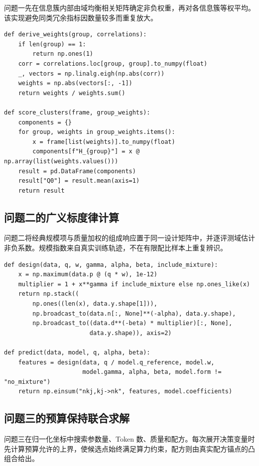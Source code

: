 \documentclass[bwprint]{gmcmthesis}
\begin{document}
\begin{appendices}
    问题一先在信息簇内部由域均衡相关矩阵确定非负权重，再对各信息簇等权平均。该实现避免同类冗余指标因数量较多而重复放大。

    \begin{lstlisting}[style=appendixcode]
def derive_weights(group, correlations):
    if len(group) == 1:
        return np.ones(1)
    corr = correlations.loc[group, group].to_numpy(float)
    _, vectors = np.linalg.eigh(np.abs(corr))
    weights = np.abs(vectors[:, -1])
    return weights / weights.sum()

def score_clusters(frame, group_weights):
    components = {}
    for group, weights in group_weights.items():
        x = frame[list(weights)].to_numpy(float)
        components[f"H_{group}"] = x @ np.array(list(weights.values()))
    result = pd.DataFrame(components)
    result["Q0"] = result.mean(axis=1)
    return result
\end{lstlisting}

    \subsection{问题二的广义标度律计算}

    问题二将经典规模项与质量加权的组成响应置于同一设计矩阵中，并逐评测域估计非负系数。规模指数来自真实训练轨迹，不在有限配比样本上重复辨识。

    \begin{lstlisting}[style=appendixcode]
def design(data, q, w, gamma, alpha, beta, include_mixture):
    x = np.maximum(data.p @ (q * w), 1e-12)
    multiplier = 1 + x**gamma if include_mixture else np.ones_like(x)
    return np.stack((
        np.ones((len(x), data.y.shape[1])),
        np.broadcast_to(data.n[:, None]**(-alpha), data.y.shape),
        np.broadcast_to((data.d**(-beta) * multiplier)[:, None],
                        data.y.shape)), axis=2)

def predict(data, model, q, alpha, beta):
    features = design(data, q / model.q_reference, model.w,
                      model.gamma, alpha, beta, model.form != "no_mixture")
    return np.einsum("nkj,kj->nk", features, model.coefficients)
\end{lstlisting}

    \newpage
    \subsection{问题三的预算保持联合求解}

    问题三在归一化坐标中搜索参数量、Token 数、质量和配方。每次展开决策变量时先计算预算允许的上界，使候选点始终满足算力约束，配方则由真实配方锚点的凸组合给出。


\end{appendices}
\end{document}
